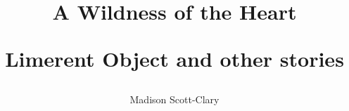 \title{\Large\TitleFamily A Wildness of the Heart

\vspace{0.25in}

\normalsize Limerent Object and other stories\vfill}
\author{\TitleFamily Madison Scott-Clary}
\date{}
